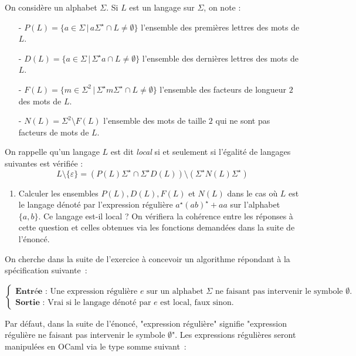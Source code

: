 \documentclass[a4paper, 11pt]{article}
\begin{document}
On considère un alphabet $\Sigma$. Si $L$ est un langage sur $\Sigma$, on note : \begin{itemize}
    \item[-] $P(L) = \{a \in \Sigma \, | \, a\Sigma^{\star} \cap L \neq \emptyset \}$ l'ensemble des premières lettres des mots de $L$.
    \item[-] $D(L) = \{a \in \Sigma \, | \, \Sigma^{\star}a \cap L \neq \emptyset \}$ l'ensemble des dernières lettres des mots de $L$.
    \item[-] $F(L) = \{m \in \Sigma^2 \, | \, \Sigma^{\star}m\Sigma^{\star} \cap L \neq \emptyset \}$ l'ensemble des facteurs de longueur $2$ des mots de $L$.
    \item[-] $N(L) = \Sigma^2 \setminus F(L)$ l'ensemble des mots de taille $2$ qui ne sont pas facteurs de mots de $L$.
\end{itemize}

On rappelle qu'un langage $L$ est dit \textit{local} si et seulement si l'égalité de langages suivantes est vérifiée : \[L\setminus\{\varepsilon\} = (P(L)\Sigma^{\star} \cap \Sigma^{\star}D(L)) \setminus (\Sigma^{\star}N(L)\Sigma^{\star}) \]

\begin{enumerate}
    \item Calculer les ensembles $P(L), D(L), F(L)$ et $N(L)$ dans le cas où $L$ est le langage dénoté par l'expression régulière $a^{\star}(ab)^{\star} + aa$ sur l'alphabet $\{a,b\}$. Ce langage est-il local ? On vérifiera la cohérence entre les réponses à cette question et celles obtenues via les fonctions demandées dans la suite de l'énoncé.
\end{enumerate}

On cherche dans la suite de l'exercice à concevoir un algorithme répondant à la spécification suivante~: \begin{center}
$\begin{cases}
    \textbf{Entrée : } \text{Une expression régulière $e$ sur un alphabet $\Sigma$ ne faisant pas intervenir le symbole $\emptyset$.} \\
    \textbf{Sortie : } \text{Vrai si le langage dénoté par $e$ est local, faux sinon.}
\end{cases}$
\end{center}

Par défaut, dans la suite de l'énoncé, "expression régulière" signifie "expression régulière ne faisant pas intervenir le symbole $\emptyset$". Les expressions régulières seront manipulées en OCaml via le type somme suivant~:
\end{document}
